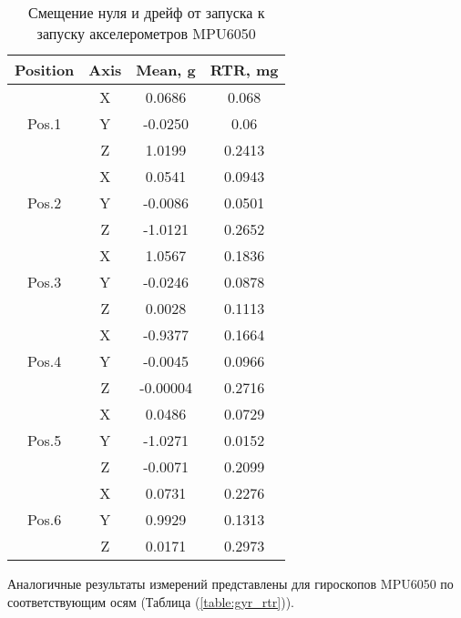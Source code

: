\begin{table}[h!]
	\centering
	\caption{Смещение нуля и дрейф от запуска к запуску акселерометров MPU6050}
	\begin{tabular}{|c|c|c|c|}
	\hline
	Position & Axis & Mean, g & RTR, mg \\ \hline
	\multirow{3}{*}{Pos.1}	& X & 0.0686 & 0.068 \\											 
							\cline{2-4}
							& Y & -0.0250 & 0.06 \\												 
							\cline{2-4}
							& Z & 1.0199 & 0.2413 \\												 
	\hline
	\multirow{3}{*}{Pos.2}	& X & 0.0541 & 0.0943 \\												 
							\cline{2-4}
							& Y & -0.0086 & 0.0501 \\												 
							\cline{2-4}
							& Z & -1.0121 & 0.2652 \\												 
	\hline	
	\multirow{3}{*}{Pos.3}	& X & 1.0567 & 0.1836 \\												 
							\cline{2-4}
							& Y & -0.0246 & 0.0878 \\												 
							\cline{2-4}
							& Z & 0.0028 & 0.1113 \\												 
	\hline
	\multirow{3}{*}{Pos.4}	& X & -0.9377 & 0.1664 \\												 
							\cline{2-4}
							& Y & -0.0045 & 0.0966 \\												 
							\cline{2-4}
							& Z & -0.00004 & 0.2716 \\												 
	\hline
	\multirow{3}{*}{Pos.5}	& X & 0.0486 & 0.0729 \\												 
							\cline{2-4}
							& Y & -1.0271 & 0.0152 \\												 
							\cline{2-4}
							& Z & -0.0071 & 0.2099 \\												 
	\hline
	\multirow{3}{*}{Pos.6}	& X & 0.0731 & 0.2276 \\												 
							\cline{2-4}
							& Y & 0.9929 & 0.1313 \\												 
							\cline{2-4}
							& Z & 0.0171 & 0.2973 \\												 
	\hline
	\end{tabular}
	\label{table:acc_rtr}
\end{table}

Аналогичные результаты измерений представлены для гироскопов MPU6050 по соответствующим осям (Таблица (\ref{table:gyr_rtr})).

